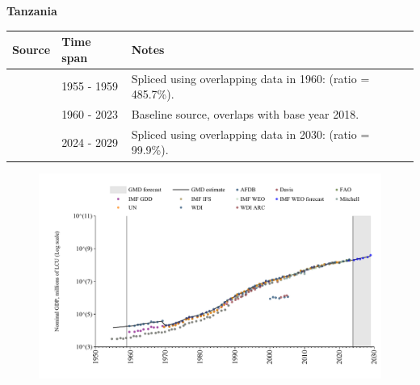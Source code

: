 \documentclass[12pt,a4paper,landscape]{article}
\begin{document}
\begin{adjustbox}{max totalsize={\paperwidth}{\paperheight},center}
\begin{minipage}[t][\textheight][t]{\textwidth}
\vspace*{0.5cm}
{}
\begin{center}
{\Large\bfseries Tanzania}
\end{center}
\vspace{0.5cm}
\begin{table}[H]
\centering
\small
\begin{tabular}{|l|l|l|}
\hline
\textbf{Source} & \textbf{Time span} & \textbf{Notes} \\
\hline
\rowcolor{white}\cite{Mitchell}& 1955 - 1959 &Spliced using overlapping data in 1960: (ratio = 485.7\%).\\
\rowcolor{lightgray}\cite{WDI}& 1960 - 2023 &Baseline source, overlaps with base year 2018.\\
\rowcolor{white}\cite{IMF_WEO_forecast}& 2024 - 2029 &Spliced using overlapping data in 2030: (ratio = 99.9\%).\\
\hline
\end{tabular}
\end{table}
\begin{figure}[H]
\centering
\includegraphics[width=\textwidth,height=0.6\textheight,keepaspectratio]{graphs/TZA_nGDP.pdf}
\end{figure}
\end{minipage}
\end{adjustbox}
\end{document}

